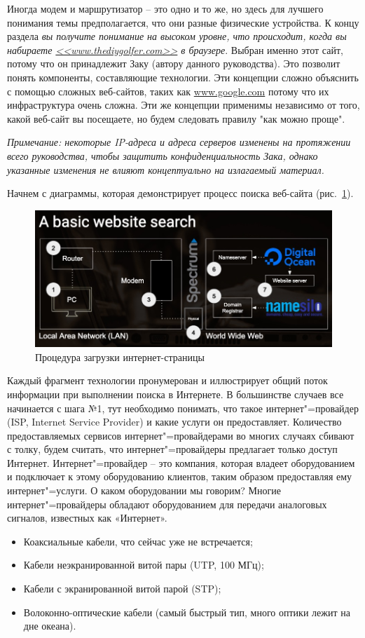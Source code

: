 \documentclass[12pt]{article}
\providecommand{\tightlist}{%
  \setlength{\itemsep}{0pt}\setlength{\parskip}{0pt}}
\begin{document}
Иногда модем и маршрутизатор -- это одно и то же, но здесь для лучшего понимания темы предполагается, что они разные физические устройства. К концу раздела \emph{вы получите понимание
на высоком уровне, что происходит, когда вы набираете
\href{http://www.thediygolfer.com}{<<www.thediygolfer.com>>} в браузере}.
Выбран именно этот сайт, потому что он принадлежит Заку (автору
данного руководства). Это позволит понять компоненты, составляющие
технологии. Эти концепции сложно объяснить с помощью сложных веб-сайтов,
таких как \href{http://www.google.com}{www.google.com} потому что их
инфраструктура очень сложна. Эти же концепции применимы независимо от
того, какой веб-сайт вы посещаете, но будем следовать правилу "как можно
проще".

\emph{Примечание: некоторые IP-адреса и адреса серверов изменены на
протяжении всего руководства, чтобы защитить конфиденциальность Зака,
однако указанные изменения не влияют концептуально на излагаемый
материал.}

Начнем с диаграммы, которая демонстрирует процесс поиска веб-сайта (рис.~\ref{fig:pageloading}).
\begin{figure}[tbh]
  \centering
  \includegraphics[width=0.9\linewidth]{blog/2019/bash-essentials/basic-web-search.jpg}

  \caption{Процедура загрузки интернет-страницы}
  \label{fig:pageloading}
\end{figure}

Каждый фрагмент технологии пронумерован и иллюстрирует общий поток информации при выполнении поиска в Интернете. В большинстве случаев все начинается с шага №1, тут необходимо понимать, что такое интернет"=провайдер (ISP, Internet Service Provider) и какие услуги он предоставляет. Количество предоставляемых сервисов интернет"=провайдерами во многих случаях сбивают с толку, будем считать, что интернет"=провайдеры предлагает только доступ Интернет. Интернет"=провайдер -- это компания, которая владеет оборудованием и подключает к этому оборудованию клиентов, таким образом предоставляя ему интернет"=услуги. О каком оборудовании мы говорим? Многие интернет"=провайдеры обладают оборудованием для передачи аналоговых сигналов, известных как «Интернет».
\begin{itemize}
\tightlist
\item
  Коаксиальные кабели, что сейчас уже не встречается;
\item
  Кабели неэкранированной витой пары (UTP, 100 МГц);
\item
  Кабели с экранированной витой парой (STP);
\item
  Волоконно-оптические кабели (самый быстрый тип, много оптики лежит на
  дне океана).
\end{itemize}
\end{document}
